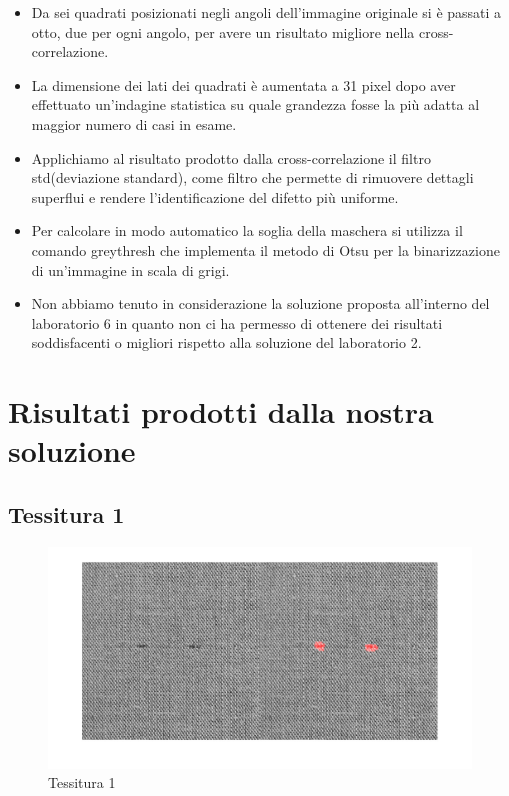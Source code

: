 \documentclass{article}
\begin{document}
\begin{itemize}

  \item Da sei quadrati posizionati negli angoli dell'immagine originale si è passati a otto, due per ogni angolo, per avere un risultato migliore nella cross-correlazione.  

  \item La dimensione dei lati dei quadrati è aumentata a 31 pixel dopo aver effettuato un'indagine statistica su quale grandezza fosse la più adatta al maggior numero di casi in esame.

  \item Applichiamo al risultato prodotto dalla cross-correlazione il filtro std(deviazione standard), come filtro che permette di rimuovere dettagli superflui e rendere l'identificazione del difetto più uniforme.

  \item Per calcolare in modo automatico la soglia della maschera si utilizza il comando greythresh che implementa il metodo di Otsu per la binarizzazione di un'immagine in scala di grigi.

  \item Non abbiamo tenuto in considerazione la soluzione proposta all'interno del laboratorio 6 in quanto non ci ha permesso di ottenere dei risultati soddisfacenti o migliori rispetto alla soluzione del laboratorio 2.
\end{itemize}

\section{Risultati prodotti dalla nostra soluzione}

\subsection{Tessitura 1}

\begin{figure}[h!]
	\centering
	\includegraphics[width=\textwidth]{results/res1.jpg}
	\caption{Tessitura 1}
\end{figure}
\end{document}
